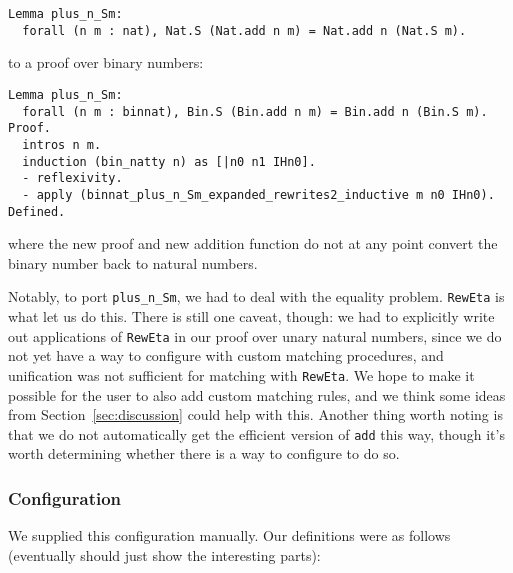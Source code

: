 \begin{lstlisting}
Lemma plus_n_Sm:
  forall (n m : nat), Nat.S (Nat.add n m) = Nat.add n (Nat.S m).
\end{lstlisting}
to a proof over binary numbers:

\begin{lstlisting}
Lemma plus_n_Sm:
  forall (n m : binnat), Bin.S (Bin.add n m) = Bin.add n (Bin.S m).
Proof.
  intros n m.
  induction (bin_natty n) as [|n0 n1 IHn0].
  - reflexivity.
  - apply (binnat_plus_n_Sm_expanded_rewrites2_inductive m n0 IHn0).
Defined.
\end{lstlisting}
where the new proof and new addition function do not at any point convert
the binary number back to natural numbers.

Notably, to port \lstinline{plus_n_Sm}, we had to deal with the equality problem.
\lstinline{RewEta} is what let us do this.
There is still one caveat, though: we had to explicitly write out applications of \lstinline{RewEta}
in our proof over unary natural numbers, since we do not yet have a way to configure \toolname with custom
matching procedures, and unification was not sufficient for matching with \lstinline{RewEta}.
We hope to make it possible for the user to also add custom matching rules,
and we think some ideas from Section~\ref{sec:discussion} could help with this.
Another thing worth noting is that we do not automatically get the efficient version of \lstinline{add} this way,
though it's worth determining whether there is a way to configure \toolname to do so.

\subsubsection{Configuration}
We supplied this configuration manually.
Our definitions were as follows (eventually should just show the interesting parts):


